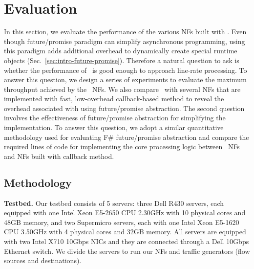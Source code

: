 \section {Evaluation} \label{sec:netstar-evaluation}

In this section, we evaluate the performance of the various NFs built with \netstar. Even though future/promise paradigm can simplify asynchronous programming, using this paradigm adds additional overhead to dynamically create special runtime objects (Sec.~\ref{sec:intro-future-promise}). Therefore a natural question to ask is whether the performance of \netstar~is good enough to approach line-rate processing. To answer this question, we design a series of experiments to evaluate the maximum throughput achieved by the \netstar~NFs. We also compare \netstar~with several NFs that are implemented with fast, low-overhead callback-based method to reveal the overhead associated with using future/promise abstraction. The second question involves the effectiveness of future/promise abstraction for simplifying the implementation. To answer this question, we adopt a similar quantitative methodology \cite{syme2011f} used for evaluating F\# future/promise abstraction and compare the required lines of code for implementing the core processing logic between \netstar~NFs and NFs built with callback method.

\subsection {Methodology}

\noindent \textbf{Testbed.} Our testbed consists of 5 servers: three Dell R430 servers, each equipped with one Intel Xeon E5-2650 CPU 2.30GHz with 10 physical cores and 48GB memory, and two Supermicro servers, each with one Intel Xeon E5-1620 CPU 3.50GHz with 4 physical cores and 32GB memory. All servers are equipped with two Intel X710 10Gbps NICs and they are connected through a Dell 10Gbps Ethernet switch. We divide the servers to run our NFs and traffic generators (flow sources and destinations). %

